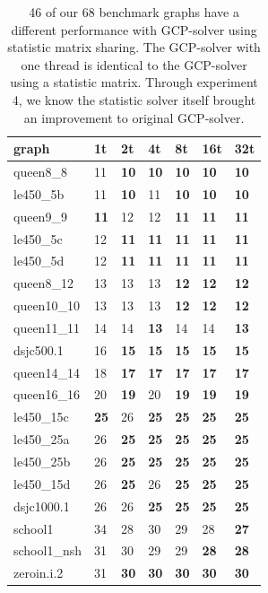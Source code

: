 \documentclass[12pt,a4paper,twoside]{scrartcl}
\numberwithin{equation}{section}
\begin{document}
\begin{table}[h!]
\caption{46 of our 68 benchmark graphs have a different performance with GCP-solver using statistic matrix sharing. The GCP-solver with one thread is identical to the GCP-solver using a statistic matrix. Through experiment 4, we know the statistic solver itself brought an improvement to original GCP-solver.}
\label{tab:statistic matrix sharing}
\small
\begin{tabular}{|p{3cm}| p{1cm} p{1cm} p{1cm} p{1cm} p{1cm} p{1cm}|}
\hline
graph&1t&2t&4t&8t&16t&32t\\ \hline
queen8\_8&11&\textbf{10}&\textbf{10}&\textbf{10}&\textbf{10}&\textbf{10}\\
le450\_5b&11&\textbf{10}&11&\textbf{10}&\textbf{10}&\textbf{10}\\ 
queen9\_9&\textbf{11}&12&12&\textbf{11}&\textbf{11}&\textbf{11}\\
le450\_5c&12&\textbf{11}&\textbf{11}&\textbf{11}&\textbf{11}&\textbf{11}\\ 
le450\_5d&12&\textbf{11}&\textbf{11}&\textbf{11}&\textbf{11}&\textbf{11}\\ \hline
queen8\_12&13&13&13&\textbf{12}&\textbf{12}&\textbf{12}\\ 
queen10\_10&13&13&13&\textbf{12}&\textbf{12}&\textbf{12}\\ 
queen11\_11&14&14&\textbf{13}&14&14&\textbf{13}\\ 
dsjc500.1&16&\textbf{15}&\textbf{15}&\textbf{15}&\textbf{15}&\textbf{15}\\ 
queen14\_14&18&\textbf{17}&\textbf{17}&\textbf{17}&\textbf{17}&\textbf{17}\\ \hline
queen16\_16&20&\textbf{19}&20&\textbf{19}&\textbf{19}&\textbf{19}\\ 
le450\_15c&\textbf{25}&26&\textbf{25}&\textbf{25}&\textbf{25}&\textbf{25}\\
le450\_25a&26&\textbf{25}&\textbf{25}&\textbf{25}&\textbf{25}&\textbf{25}\\ 
le450\_25b&26&\textbf{25}&\textbf{25}&\textbf{25}&\textbf{25}&\textbf{25}\\
le450\_15d&26&\textbf{25}&26&\textbf{25}&\textbf{25}&\textbf{25}\\ \hline
dsjc1000.1&26&26&\textbf{25}&\textbf{25}&\textbf{25}&\textbf{25}\\
school1&34&28&30&29&28&\textbf{27}\\ 
school1\_nsh&31&30&29&29&\textbf{28}&\textbf{28}\\ 
zeroin.i.2&31&\textbf{30}&\textbf{30}&\textbf{30}&\textbf{30}&\textbf{30}\\ 

\end{tabular}
\end{table}
\end{document}
